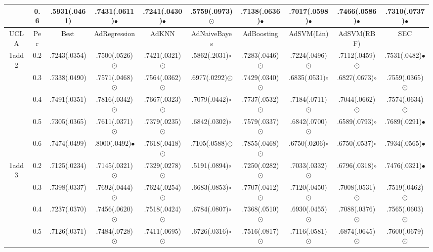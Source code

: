 \documentclass[10pt,journal,compsoc]{IEEEtran}
\begin{document}
\begin{table*}[!t]
{\begin{tabular}{c||c|| c c c c c c c c }
     & 0.6 & .5931(.0461) & .7431(.0611)$\bullet$ & .7241(.0430)$\bullet$ & .5759(.0973){\tiny $\odot$} & .7138(.0636)$\bullet$ & .7017(.0598)$\bullet$ & .7466(.0586)$\bullet$ & .7310(.0737)$\bullet$ \\
\hline
UCLA & Per       &  Best   &  AdRegression   & AdKNN    & AdNaiveBayes    & AdBoosting &  AdSVM(Lin) & AdSVM(RBF) & SEC \\
\hline
1add2& 0.2 &.7243(.0354) & .7500(.0526){\tiny $\odot$} & .7421(.0321){\tiny $\odot$} & .5862(.2031)$\circ$ & .7283(.0446){\tiny $\odot$} & .7224(.0496){\tiny $\odot$} & .7112(.0459){\tiny $\odot$} & .7531(.0482)$\bullet$ \\
     & 0.3 &.7338(.0490) & .7571(.0468){\tiny $\odot$} & .7564(.0362){\tiny $\odot$} & .6977(.0292){\tiny $\odot$} & .7429(.0340){\tiny $\odot$} & .6835(.0531)$\circ$ & .6827(.0673)$\circ$ & .7559(.0365){\tiny $\odot$} \\
     & 0.4 &.7491(.0351) & .7816(.0342){\tiny $\odot$} & .7667(.0323){\tiny $\odot$} & .7079(.0442)$\circ$ & .7737(.0532){\tiny $\odot$} & .7184(.0711){\tiny $\odot$} & .7044(.0662){\tiny $\odot$} & .7574(.0634){\tiny $\odot$} \\
     & 0.5 &.7305(.0365) & .7611(.0371){\tiny $\odot$} & .7379(.0235){\tiny $\odot$} & .6842(.0302)$\circ$ & .7579(.0337){\tiny $\odot$} & .6842(.0700){\tiny $\odot$} & .6589(.0793)$\circ$ & .7689(.0291)$\bullet$ \\
     & 0.6 &.7474(.0499) & .8000(.0492)$\bullet$  & .7618(.0418){\tiny $\odot$} & .7105(.0588){\tiny $\odot$} & .7855(.0468){\tiny $\odot$} & .6750(.0206)$\circ$ & .6750(.0537)$\circ$ & .7934(.0565)$\bullet$ \\
\hline
1add3 &0.2 &.7125(.0234) & .7145(.0321){\tiny $\odot$} & .7329(.0278){\tiny $\odot$} & .5191(.0894)$\circ$ & .7250(.0282){\tiny $\odot$} & .7033(.0332){\tiny $\odot$} & .6796(.0318)$\circ$ & .7476(.0321)$\bullet$ \\
      &0.3 &.7398(.0337) & .7692(.0444){\tiny $\odot$} & .7624(.0254){\tiny $\odot$} & .6683(.0853)$\circ$ & .7707(.0412){\tiny $\odot$} & .7120(.0450){\tiny $\odot$} & .7008(.0531){\tiny $\odot$} & .7519(.0462){\tiny $\odot$} \\
      &0.4 &.7237(.0370) & .7456(.0620){\tiny $\odot$} & .7518(.0424){\tiny $\odot$} & .6784(.0807)$\circ$  & .7368(.0510){\tiny $\odot$} & .6930(.0455){\tiny $\odot$} & .7088(.0376){\tiny $\odot$} & .7565(.0603){\tiny $\odot$} \\
      &0.5 &.7126(.0371) & .7484(.0728){\tiny $\odot$} & .7411(.0695){\tiny $\odot$} & .6726(.0316)$\circ$  & .7516(.0817){\tiny $\odot$} & .7116(.0581){\tiny $\odot$} & .6874(.0645){\tiny $\odot$} & .7600(.0679){\tiny $\odot$} \\

\end{tabular}}
\end{table*}
\end{document}
